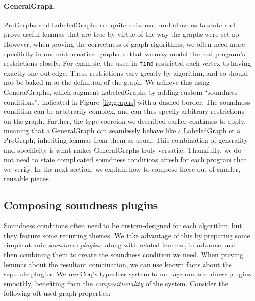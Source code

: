\vspace{-0.75ex}
\paragraph{GeneralGraph.}
PreGraphs and LabeledGraphs are quite universal, and allow us to state
and prove useful lemmas that are true by virtue of the way the graphs
were set up. However, when proving the correctness of graph
algorithms, we often need more specificity in our mathematical graphs
so that we may model the real program's restrictions closely. 
For example, the  used in \texttt{find} 
restricted each vertex to having exactly one out-edge.  
These restrictions vary greatly by algorithm, and so should 
not be baked in to the definition of the graph. 
We achieve this using GeneralGraphs, which augment 
LabeledGraphs by adding custom ``soundness conditions'', indicated in
Figure~\ref{fig:graphs} with a dashed border.  
The soundness condition can be arbitrarily
complex, and can thus specify arbitrary restrictions on the graph.
Further, the type coercion we described earlier continues to apply, 
meaning that a GeneralGraph can seamlessly behave like a 
LabeledGraph or a PreGraph, inheriting lemmas from them as usual.
This combination of generality and specificity is 
what makes GeneralGraphs truly versatile. Thankfully, we do
not need to state complicated soundness conditions afresh for
each program that we verify. In the next section, we explain how to
compose these out of smaller, reusable pieces.


\subsection{Composing soundness plugins}
\label{subsec:graphplugins}

Soundness conditions often need to be custom-designed 
for each algorithm, but they feature some recurring themes.
We take advantage of this by preparing some simple atomic 
\emph{soundness plugins}, along with related lemmas, in advance, 
and then combining them to create the soundness condition we need.
When proving lemmas about the resultant combination, we can use known
facts about the separate plugins. 
We use Coq's typeclass system to manage our soundness plugins
smoothly, benefiting from the \emph{compositionality} of the system.
Consider the following oft-used graph properties:

